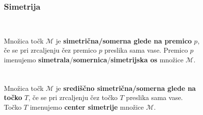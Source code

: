         \begin{frame}
            \frametitle{Simetrija}

            \begin{columns}
                ~\\
                Množica točk $\mathcal{M}$ je \textbf{simetrična/somerna glede na premico} $p$, 
                če se pri zrcaljenju čez premico $p$ preslika sama vase. 
                Premico $p$ imenujemo \textbf{simetrala}/\textbf{somernica}/\textbf{simetrijska os} množice $\mathcal{M}$. 
                 ~\\      
                 ~\\      
                Množica točk $\mathcal{M}$ je \textbf{središčno simetrična/somerna glede na točko} $T$, 
                če se pri zrcaljenju čez točko $T$ preslika sama vase. 
                Točko $T$ imenujemo \textbf{center simetrije} množice $\mathcal{M}$. 
                \begin{figure}

                \end{figure}
            \end{columns}


        \end{frame}




        


